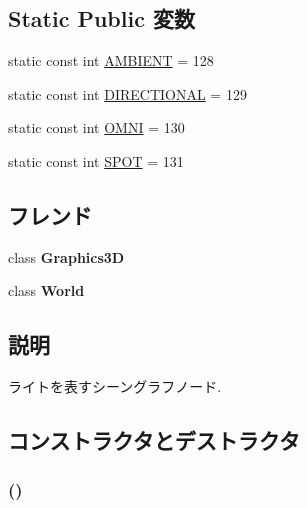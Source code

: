 \subsection*{Static Public 変数}
\begin{CompactItemize}
\item 
static const int \hyperlink{classm3g_1_1Light_4cf648a82d9de62a1fb15f4277049594}{AMBIENT} = 128
\item 
static const int \hyperlink{classm3g_1_1Light_a2fb668ca8bbeb8323eda98fba594fda}{DIRECTIONAL} = 129
\item 
static const int \hyperlink{classm3g_1_1Light_34d360bb8395ad7fbcd3ec286ece64cb}{OMNI} = 130
\item 
static const int \hyperlink{classm3g_1_1Light_c44aef16b96dc8fd8b134416964a7de9}{SPOT} = 131
\end{CompactItemize}
\subsection*{フレンド}
\begin{CompactItemize}
\item 
\hypertarget{classm3g_1_1Light_8174d4c629550c1ee279571250236ef4}{
class \textbf{Graphics3D}}
\label{classm3g_1_1Light_8174d4c629550c1ee279571250236ef4}

\item 
\hypertarget{classm3g_1_1Light_7b4bcdf992c21ae83363f25df05b1d25}{
class \textbf{World}}
\label{classm3g_1_1Light_7b4bcdf992c21ae83363f25df05b1d25}

\end{CompactItemize}


\subsection{説明}
ライトを表すシーングラフノード. 

\subsection{コンストラクタとデストラクタ}
\hypertarget{classm3g_1_1Light_7f8a7be05225f470c200f7e4ff914a3c}{
\subsubsection[{Light}]{ ()}}
\label{classm3g_1_1Light_7f8a7be05225f470c200f7e4ff914a3c}


